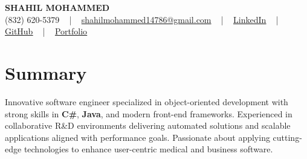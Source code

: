 \documentclass[letterpaper,10pt]{article}
\begin{document}
\begin{center}
    {\fontsize{14pt}{12pt}\selectfont \textbf{\MakeUppercase{Shahil Mohammed}}}\\ \vspace{2pt}
    \fontsize{10pt}{12pt}\selectfont (832) 620-5379 ~ | ~ \href{mailto:shahilmohammed14786@gmail.com}{shahilmohammed14786@gmail.com} ~ | ~  
    \href{https://www.linkedin.com/in/shahil-mohammed-9652931a1/}{\color{blue}\underline{LinkedIn}}  ~ | ~ 
    \href{https://github.com/freakbeast14}{\color{blue}\underline{GitHub}} ~ | ~ 
    \href{https://shahil-mohammed.netlify.app/}{\color{blue}\underline{Portfolio}}
    \vspace{-8pt}
\end{center}

\section{Summary}
\vspace{-2pt}\fontsize{8pt}{9pt}\selectfont
Innovative software engineer specialized in object-oriented development with strong skills in \textbf{C\#}, \textbf{Java}, and modern front-end frameworks. Experienced in collaborative R\&D environments delivering automated solutions and scalable applications aligned with performance goals. Passionate about applying cutting-edge technologies to enhance user-centric medical and business software.
 \vspace{-5pt}
 
\vspace{-2pt}
\end{document}
